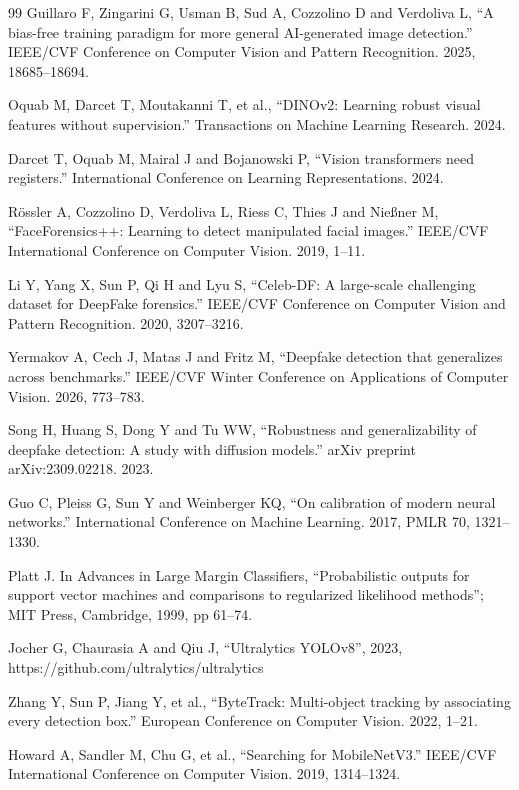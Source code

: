\documentclass[12pt,a4paper,oneside]{report}
\begin{document}
\begin{thebibliography}{99}
 Guillaro F, Zingarini G, Usman B, Sud A, Cozzolino D and Verdoliva L, ``A bias-free training paradigm for more general AI-generated image detection.'' IEEE/CVF Conference on Computer Vision and Pattern Recognition. 2025, 18685--18694.

 Oquab M, Darcet T, Moutakanni T, et al., ``DINOv2: Learning robust visual features without supervision.'' Transactions on Machine Learning Research. 2024.

 Darcet T, Oquab M, Mairal J and Bojanowski P, ``Vision transformers need registers.'' International Conference on Learning Representations. 2024.

 R\"ossler A, Cozzolino D, Verdoliva L, Riess C, Thies J and Nie{\ss}ner M, ``FaceForensics++: Learning to detect manipulated facial images.'' IEEE/CVF International Conference on Computer Vision. 2019, 1--11.

 Li Y, Yang X, Sun P, Qi H and Lyu S, ``Celeb-DF: A large-scale challenging dataset for DeepFake forensics.'' IEEE/CVF Conference on Computer Vision and Pattern Recognition. 2020, 3207--3216.

 Yermakov A, Cech J, Matas J and Fritz M, ``Deepfake detection that generalizes across benchmarks.'' IEEE/CVF Winter Conference on Applications of Computer Vision. 2026, 773--783.

 Song H, Huang S, Dong Y and Tu WW, ``Robustness and generalizability of deepfake detection: A study with diffusion models.'' arXiv preprint arXiv:2309.02218. 2023.

 Guo C, Pleiss G, Sun Y and Weinberger KQ, ``On calibration of modern neural networks.'' International Conference on Machine Learning. 2017, PMLR 70, 1321--1330.

 Platt J. In Advances in Large Margin Classifiers, ``Probabilistic outputs for support vector machines and comparisons to regularized likelihood methods''; MIT Press, Cambridge, 1999, pp 61--74.

 Jocher G, Chaurasia A and Qiu J, ``Ultralytics YOLOv8'', 2023, https://github.com/ultralytics/ultralytics

 Zhang Y, Sun P, Jiang Y, et al., ``ByteTrack: Multi-object tracking by associating every detection box.'' European Conference on Computer Vision. 2022, 1--21.

 Howard A, Sandler M, Chu G, et al., ``Searching for MobileNetV3.'' IEEE/CVF International Conference on Computer Vision. 2019, 1314--1324.


\end{thebibliography}
\end{document}
